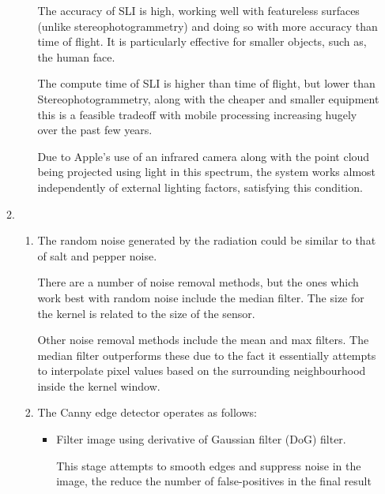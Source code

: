 \documentclass[12pt,a4paper]{article}
\begin{document}
\begin{enumerate}
\begin{enumerate}
\begin{enumerate}
                                The accuracy of SLI is high, working well with featureless surfaces (unlike stereophotogrammetry) and doing so with more accuracy than time of flight. It is particularly effective for smaller objects, such as, the human face.

                                The compute time of SLI is higher than time of flight, but lower than Stereophotogrammetry, along with the cheaper and smaller equipment this is a feasible tradeoff with mobile processing increasing hugely over the past few years.

                                Due to Apple's use of an infrared camera along with the point cloud being projected using light in this spectrum, the system works almost independently of external lighting factors, satisfying this condition.




                        \end{enumerate}


                  \item

                        \begin{enumerate}
                          \item The random noise generated by the radiation could be similar to that of salt and pepper noise.

                                There are a number of noise removal methods, but the ones which work best with random noise include the median filter. The size for the kernel is related to the size of the sensor.

                                Other noise removal methods include the mean and max filters. The median filter outperforms these due to the fact it essentially attempts to interpolate pixel values based on the surrounding neighbourhood inside the kernel window.

                          \item The Canny edge detector operates as follows:

                                \begin{itemize}
                                  \item Filter image using derivative of Gaussian filter (DoG) filter.

                                        This stage attempts to smooth edges and suppress noise in the image, the reduce the number of false-positives in the final result


\end{itemize}
\end{enumerate}
\end{enumerate}
\end{enumerate}
\end{document}
